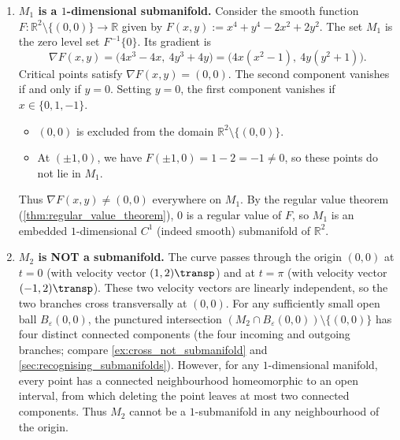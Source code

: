 \begin{exercisesolution}
\label{sol:identifying_one_submanifolds_in_plane}
\begin{enumerate}[label=\textbf{(\alph*)}]
  \item \textbf{$M_1$ is a $1$-dimensional submanifold.}
    Consider the smooth function $F : \mathbb{R}^2 \setminus \{(0,0)\} \to \mathbb{R}$ given by
    $F(x,y) := x^4 + y^4 - 2x^2 + 2y^2$. The set $M_1$ is the zero level set $F^{-1}\{0\}$.
    Its gradient is
    \[\nabla F(x,y) = \big(4x^3 - 4x,\ 4y^3 + 4y\big) = \big(4x(x^2-1),\ 4y(y^2+1)\big).\]
    Critical points satisfy $\nabla F(x,y) = (0,0)$. The second component vanishes if and only if $y = 0$.
    Setting $y = 0$, the first component vanishes if $x \in \{0, 1, -1\}$.
    \begin{itemize}
      \item $(0,0)$ is excluded from the domain $\mathbb{R}^2 \setminus \{(0,0)\}$.
      \item At $(\pm 1, 0)$, we have $F(\pm 1, 0) = 1 - 2 = -1 \neq 0$, so these points do not lie in $M_1$.
    \end{itemize}
    Thus $\nabla F(x,y) \neq (0,0)$ everywhere on $M_1$. By the regular value theorem
    (\cref{thm:regular_value_theorem}), $0$ is a regular value of $F$, so $M_1$ is an embedded
    $1$-dimensional $C^1$ (indeed smooth) submanifold of $\mathbb{R}^2$.

  \item \textbf{$M_2$ is NOT a submanifold.}
    The curve passes through the origin $(0,0)$ at $t = 0$ (with velocity vector $(1, 2)\transp$) and
    at $t = \pi$ (with velocity vector $(-1, 2)\transp$). These two velocity vectors are linearly
    independent, so the two branches cross transversally at $(0,0)$.
    For any sufficiently small open ball $B_\varepsilon(0,0)$, the punctured intersection
    $(M_2 \cap B_\varepsilon(0,0)) \setminus \{(0,0)\}$ has four distinct connected components
    (the four incoming and outgoing branches; compare \cref{ex:cross_not_submanifold} and
    \cref{sec:recognising_submanifolds}). However, for any $1$-dimensional manifold, every point has a
    connected neighbourhood homeomorphic to an open interval, from which deleting the point leaves at
    most two connected components. Thus $M_2$ cannot be a $1$-submanifold in any neighbourhood of the origin.


\end{enumerate}
\end{exercisesolution}
